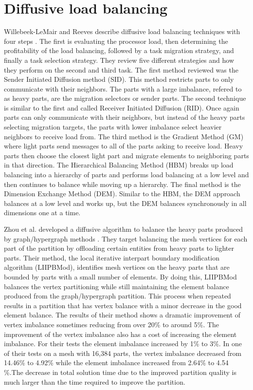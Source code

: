 \documentclass{thesis}
\begin{document}
\section{Diffusive load balancing}
Willebeek-LeMair and Reeves describe diffusive load balancing techniques with 
four steps \cite{loadbalance}. The first is evaluating the processor load, then 
determining the profitability of the load balancing, followed by a task 
migration strategy, and finally a task selection strategy. They review 
five different strategies and how they perform on the second and third task. 
The first method reviewed was the Sender Initiated Diffusion method (SID). 
This method restricts parts to only communicate with their neighbors. The 
parts with a large imbalance, refered to as heavy parts, are the migration 
selectors or sender parts. The second technique is 
similar to the first and called Receiver Initiated Diffusion (RID). Once again 
parts can only communicate with their neighbors, but instead of the heavy parts
selecting migration targets, the parts with lower imbalance select heavier 
neighbors to receive
load from. The third method is the Gradient Method (GM) where light parts send 
messages to all of the parts asking to receive load. Heavy parts then choose 
the closest light part and migrate elements to neighboring parts in that 
direction. The Hierarchical Balancing Method (HBM) breaks up load balancing 
into a 
hierarchy of parts and performs load balancing at a low level and then continues
to balance while moving up a hierarchy. The final method is the Dimension 
Exchange Method (DEM). Similar to the HBM, the DEM approach balances at a low 
level and works up, but the DEM balances synchronously in all dimensions one at 
a time.

Zhou et al. developed a diffusive algorithm to balance the heavy parts produced 
by graph/hypergraph methods \cite{zhougraph}. They target balancing the mesh 
vertices for each
part of the partition by offloading certain entities from heavy parts to 
lighter parts. Their method, the local iterative interpart boundary 
modification algorithm (LIIPBMod), identifies mesh vertices on the heavy parts
that are bounded by parts with a small number of elements. By doing this, 
LIIPBMod balances the vertex partitioning while still maintaining the element 
balance produced from the graph/hypergraph partition. This process when repeated 
results in a partition that has vertex balance with a minor decrease in the 
good element balance. The results of their method shows a dramatic improvement
of vertex imbalance sometimes reducing from over 20\% to around 5\%. The 
improvement of the vertex imbalance also has a cost of increasing the element 
imbalance. For their tests the element imbalance increased by 1\% to 3\%. In 
one of their tests on a mesh with 16,384 parts, the vertex imbalance decreased 
from 14.46\% to 4.92\% while the element imbalance increased from 2.64\% to 
4.54 \%.The decrease in total solution time due to the improved partition 
quality is much larger than the time required to improve the partition.
\end{document}
